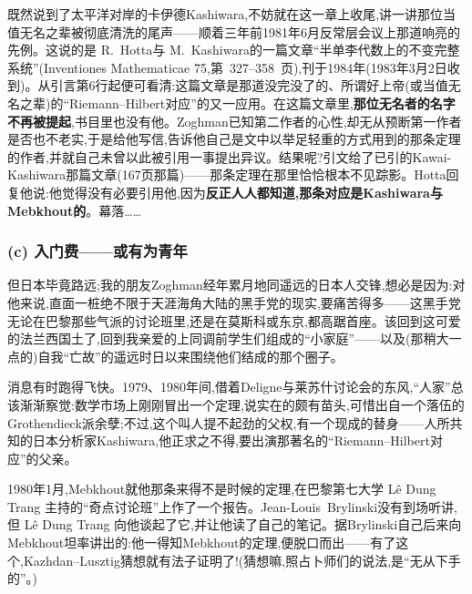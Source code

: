 \noindent 既然说到了太平洋对岸的卡伊德Kashiwara,不妨就在这一章上收尾,讲一讲那位当值无名之辈被彻底清洗的尾声——顺着三年前1981年6月反常层会议上那道响亮的先例。这说的是 R.~Hotta与 M.~Kashiwara的一篇文章“半单李代数上的不变完整系统”(Inventiones Mathematicae 75,第~327--358~页),刊于1984年(1983年3月2日收到)。从引言第6行起便可看清:这篇文章是那道没完没了的、所谓好上帝(或当值无名之辈)的“Riemann--Hilbert对应”的又一应用。在这篇文章里,\textbf{那位无名者的名字不再被提起},书目里也没有他。Zoghman已知第二作者的心性,却无从预断第一作者是否也不老实,于是给他写信,告诉他自己是文中以举足轻重的方式用到的那条定理的作者,并就自己未曾以此被引用一事提出异议。结果呢?引文给了已引的Kawai-Kashiwara那篇文章(167页那篇)——那条定理在那里恰恰根本不见踪影。Hotta回复他说:他觉得没有必要引用他,因为\textbf{反正人人都知道,那条对应是Kashiwara与Mebkhout的}。幕落……

\subsubsection*{(c) 入门费——或有为青年}


\noindent 但日本毕竟路远;我的朋友Zoghman经年累月地同遥远的日本人交锋,想必是因为:对他来说,直面一桩绝不限于天涯海角大陆的黑手党的现实,要痛苦得多——这黑手党无论在巴黎那些气派的讨论班里,还是在莫斯科或东京,都高踞\dmark{}首座。该回到这可爱的法兰西国土了,回到我亲爱的上同调前学生们组成的“小家庭”——以及(那稍大一点的)自我“亡故”的遥远时日以来围绕他们结成的那个圈子。

\noindent 消息有时跑得飞快。1979、1980年间,借着Deligne与莱苏什讨论会的东风,“人家”总该渐渐察觉:数学市场上刚刚冒出一个定理,说实在的颇有苗头,可惜出自一个落伍的Grothendieck派余孽;不过,这个叫人提不起劲的父权,有一个现成的替身——人所共知的日本分析家Kashiwara,他正求之不得,要出演那著名的“Riemann--Hilbert对应”的父亲。

\noindent 1980年1月,Mebkhout就他那条来得不是时候的定理,在巴黎第七大学 Lê Dung Trang 主持的“奇点讨论班”上作了一个报告。Jean-Louis~Brylinski没有到场听讲,但 Lê Dung Trang 向他谈起了它,并让他读了自己的笔记。据Brylinski自己后来向Mebkhout坦率讲出的:他一得知Mebkhout的定理,便脱口而出——有了这个,Kazhdan--Lusztig猜想就有法子证明了!(猜想嘛,照占卜师们的说法,是“无从下手的”。)

